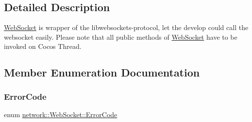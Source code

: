 \subsection{Detailed Description}
\hyperlink{classnetwork_1_1WebSocket}{Web\+Socket} is wrapper of the libwebsockets-\/protocol, let the develop could call the websocket easily. Please note that all public methods of \hyperlink{classnetwork_1_1WebSocket}{Web\+Socket} have to be invoked on Cocos Thread. 

\subsection{Member Enumeration Documentation}
\mbox{\label{classnetwork_1_1WebSocket_a33c111a23355ac485e3a56c9d0ab9a59}} 
\subsubsection{\texorpdfstring{Error\+Code}{ErrorCode}\hspace{0.1cm}{\footnotesize\ttfamily [1/2]}}
{\footnotesize\ttfamily enum \hyperlink{classnetwork_1_1WebSocket_a33c111a23355ac485e3a56c9d0ab9a59}{network\+::\+Web\+Socket\+::\+Error\+Code}\hspace{0.3cm}{\ttfamily [strong]}}

